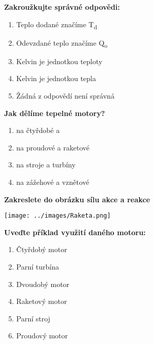 \documentclass[../main.tex]{subfiles}
\begin{document}
\begin{enumerate}[label={\textbf{\arabic*.}}]
\begin{minipage}{0.45\textwidth}
    \item \textbf{Zakroužkujte správné odpovědi:}
        \begin{enumerate}[label={\alph*)}, itemsep=0pt, topsep=0.15cm]
            \item {Teplo dodané značíme T\textsubscript{d}}
            \item {Odevzdané teplo značíme Q\textsubscript{o}}
            \item {Kelvin je jednotkou teploty}
            \item {Kelvin je jednotkou tepla}
            \item {Žádná z odpovědí není správná}
        \end{enumerate}
    
    \item \textbf{Jak dělíme tepelné motory?}
        \begin{enumerate}[label={\alph*)}, itemsep=0pt, topsep=0.15cm]
            \item \tecky{2cm} na čtyřdobé a \tecky{2cm}
            \item \tecky{2cm} na proudové a raketové
            \item \tecky{2cm} na \tecky{1cm} stroje a \tecky{1cm} turbíny
            \item \tecky{2cm} na zážehové a vznětové
        \end{enumerate}
\end{minipage}
\hfill
\begin{minipage}[t]{0.4\textwidth}
    \vspace{-12.4cm}

    \item \textbf{Zakreslete do obrázku sílu akce a reakce}
        \begin{center}
            \texttt{[image: ../images/Raketa.png]}
        \end{center}

    \item \textbf{Uveďte příklad využití daného motoru:}
    \begin{enumerate}[label={\arabic*.}, itemsep=0pt, topsep=0.15cm]
        \item {Čtyřdobý motor}\hfill\tecky{3.75cm}
        \item {Parní turbína}\hfill\tecky{3.75cm}
        \item {Dvoudobý motor}\hfill\tecky{3.75cm}
        \item {Raketový motor}\hfill\tecky{3.75cm}
        \item {Parní stroj}\hfill\tecky{3.75cm}
        \item {Proudový motor}\hfill\tecky{3.75cm}
    \end{enumerate}
    

\end{minipage}
\end{enumerate}
\end{document}
